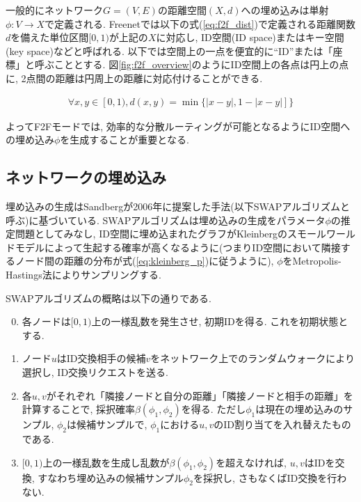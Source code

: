 \documentclass[technicalreport]{./ieicej-v3.0/UTF/ieicej}
\begin{document}
   一般的にネットワーク$G=(V,E)$の距離空間$(X,d)$への埋め込みは単射$\phi:V \to X$で定義される\cite{papadimitriou2005conjecture}. Freenetでは以下の式(\ref{eq:f2f_dist})で定義される距離関数$d$を備えた単位区間$[0,1)$が上記の$X$に対応し, ID空間(ID space)またはキー空間(key space)などと呼ばれる. 以下では空間上の一点を便宜的に``ID''または「座標」と呼ぶこととする. 図\ref{fig:f2f_overview}のようにID空間上の各点は円上の点に, 2点間の距離は円周上の距離に対応付けることができる.

   \begin{eqnarray}
    \forall x,y \in [0,1), d(x,y) = \min\{|x-y|, 1 - |x-y|]\} \label{eq:f2f_dist}
   \end{eqnarray}

   よってF2Fモードでは, 効率的な分散ルーティングが可能となるようにID空間への埋め込み$\phi$を生成することが重要となる.

   \subsection{ネットワークの埋め込み}
   埋め込みの生成はSandbergが2006年に提案した手法(以下SWAPアルゴリズムと呼ぶ)に基づいている\cite{sandberg2006distributed}. SWAPアルゴリズムは埋め込みの生成をパラメータ$\phi$の推定問題としてみなし, ID空間に埋め込まれたグラフがKleinbergのスモールワールドモデルによって生起する確率が高くなるように(つまりID空間において隣接するノード間の距離の分布が式(\ref{eq:kleinberg_p})に従うように), $\phi$をMetropolis-Hastings法によりサンプリングする.

   SWAPアルゴリズムの概略は以下の通りである.

   \begin{enumerate}
    \setcounter{enumi}{-1}
    \item
各ノードは$[0,1)$上の一様乱数を発生させ, 初期IDを得る. これを初期状態とする.

    \item
ノード$u$はID交換相手の候補$v$をネットワーク上でのランダムウォークにより選択し, ID交換リクエストを送る.

    \item
各$u,v$がそれぞれ「隣接ノードと自分の距離」「隣接ノードと相手の距離」を計算することで, 採択確率$\beta(\phi_1, \phi_2)$を得る. ただし$\phi_1$は現在の埋め込みのサンプル, $\phi_2$は候補サンプルで, $\phi_1$における$u,v$のID割り当てを入れ替えたものである.

    \item
$[0,1)$上の一様乱数を生成し乱数が$\beta(\phi_1, \phi_2)$を超えなければ, $u,v$はIDを交換, すなわち埋め込みの候補サンプル$\phi_2$を採択し, さもなくばID交換を行わない.
   \end{enumerate}
\end{document}

